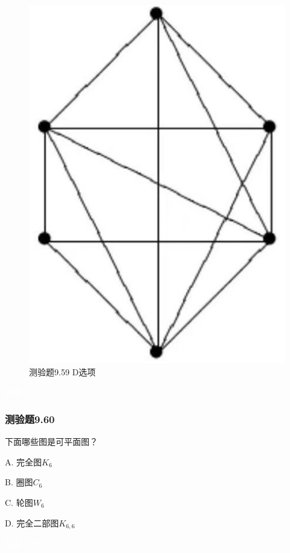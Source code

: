 \documentclass[UTF8, heading=true]{ctexart}
\begin{document}
\begin{figure}[H]
\begin{minipage}[t]{0.26\textwidth}
      \includegraphics[width=1\textwidth]{9.59_4.jpg} %
      \vspace{-0.3cm}
      \caption{测验题9.59 D选项}
\end{minipage}
\end{figure}

\textcolor{white}{答案：BC}

\subsubsection{测验题9.60}

下面哪些图是可平面图？

A. 完全图$K_6$

B. 圈图$C_6$

C. 轮图$W_6$

D. 完全二部图$K_{6,6} $

\textcolor{white}{答案：BC}
\end{document}
